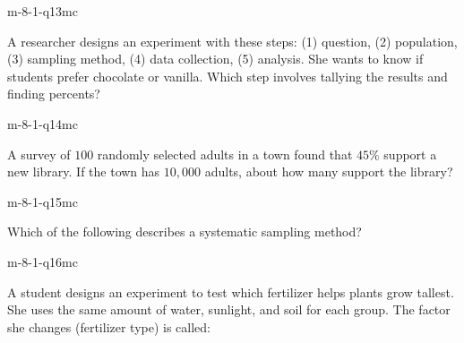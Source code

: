 \begin{practiceQuestion}{m-8-1-q13}{mc}
\begin{questionText}
A researcher designs an experiment with these steps: (1) question, (2) population, (3) sampling method, (4) data collection, (5) analysis. She wants to know if students prefer chocolate or vanilla. Which step involves tallying the results and finding percents?
\end{questionText}
\end{practiceQuestion}

\begin{practiceQuestion}{m-8-1-q14}{mc}
\begin{questionText}
A survey of $100$ randomly selected adults in a town found that $45\%$ support a new library. If the town has $10{,}000$ adults, about how many support the library?
\end{questionText}
\end{practiceQuestion}

\begin{practiceQuestion}{m-8-1-q15}{mc}
\begin{questionText}
Which of the following describes a systematic sampling method?
\end{questionText}
\end{practiceQuestion}

\begin{practiceQuestion}{m-8-1-q16}{mc}
\begin{questionText}
A student designs an experiment to test which fertilizer helps plants grow tallest. She uses the same amount of water, sunlight, and soil for each group. The factor she changes (fertilizer type) is called:
\end{questionText}
\end{practiceQuestion}

